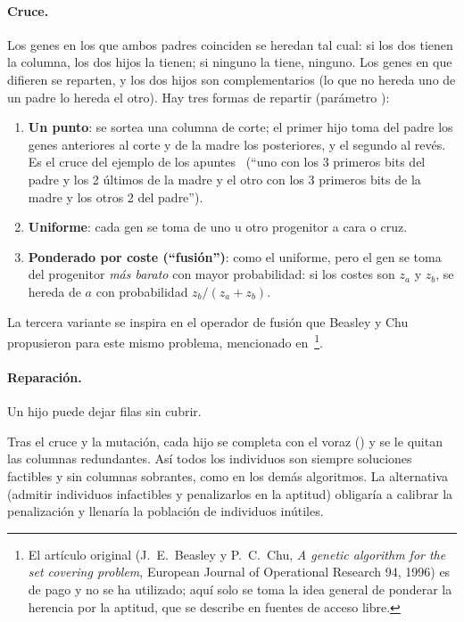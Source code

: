 \paragraph{Cruce.} Los genes en los que ambos padres coinciden se heredan tal cual: si los
dos tienen la columna, los dos hijos la tienen; si ninguno la tiene, ninguno. Los genes en
que difieren se reparten, y los dos hijos son complementarios (lo que no hereda uno de un
padre lo hereda el otro). Hay tres formas de repartir (parámetro ):
\begin{enumerate}
  \item \textbf{Un punto}: se sortea una columna de corte; el primer hijo toma del padre los
        genes anteriores al corte y de la madre los posteriores, y el segundo al revés. Es el
        cruce del ejemplo de los apuntes~\cite{yanez} (``uno con los 3 primeros bits del padre
        y los 2 últimos de la madre y el otro con los 3 primeros bits de la madre y los otros
        2 del padre'').
  \item \textbf{Uniforme}: cada gen se toma de uno u otro progenitor a cara o cruz.
  \item \textbf{Ponderado por coste (``fusión'')}: como el uniforme, pero el gen se toma del
        progenitor \emph{más barato} con mayor probabilidad: si los costes son $z_a$ y
        $z_b$, se hereda de $a$ con probabilidad $z_b/(z_a+z_b)$.
\end{enumerate}
La tercera variante se inspira en el operador de fusión que Beasley y Chu propusieron para
este mismo problema, mencionado en~\cite{tayebi}\footnote{El artículo original (J.~E.~Beasley
y P.~C.~Chu, \emph{A genetic algorithm for the set covering problem}, European Journal of
Operational Research 94, 1996) es de pago y no se ha utilizado; aquí solo se toma la idea
general de ponderar la herencia por la aptitud, que se describe en fuentes de acceso libre.}.

\paragraph{Reparación.} Un hijo puede dejar filas sin cubrir.

\begin{decision}
Tras el cruce y la mutación, cada hijo se completa con el voraz () y se le
quitan las columnas redundantes. Así todos los individuos son siempre soluciones factibles y
sin columnas sobrantes, como en los demás algoritmos. La alternativa (admitir individuos
infactibles y penalizarlos en la aptitud) obligaría a calibrar la penalización y llenaría la
población de individuos inútiles.
\end{decision}

